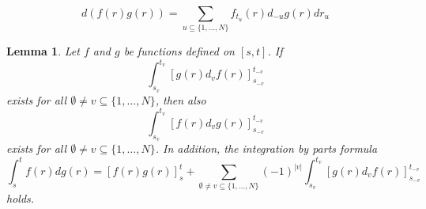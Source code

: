 \documentclass[10pt,a4paper]{amsart}
\newtheorem{lemma}{Lemma}
\begin{document}
\begin{equation}
\label{productrule}
d(f(r)g(r)) = \sum_{u\subseteq \{1,\dots,N\}} f_{t_u}(r) d_{-u}g(r) dr_u
\end{equation}

\begin{lemma}
\label{lemma:ipp}
Let $f$ and $g$ be functions defined on $[s,t]$. If
\begin{equation*}
\int_{s_v}^{t_v}[g(r) d_vf(r)]_{s_{-v}}^{t_{-v}}
\end{equation*}
exists for all $\emptyset \neq v \subseteq \{1,\dots,N\}$, then also
\begin{equation*}
\int_{s_v}^{t_v}[f(r) d_vg(r)]_{s_{-v}}^{t_{-v}}
\end{equation*}
exists for all $\emptyset \neq v \subseteq \{1,\dots,N\}$. In addition, the integration by parts formula 
\begin{equation}
\label{iip}
\int_s^t f(r) dg(r) = [f(r)g(r)]_s^t + \sum_{\emptyset\neq v \subseteq \{1,\dots,N\}}(-1)^{|v|} \int_{s_v}^{t_v} [g(r)d_vf(r)]_{s_{-v}}^{t_{-v}}
\end{equation}
holds.
\end{lemma}
\end{document}

